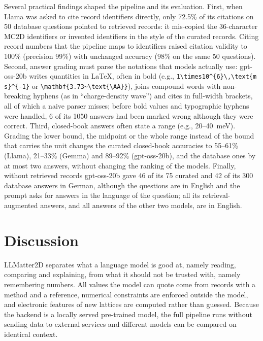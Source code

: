 \documentclass[prmaterials,twocolumn,superscriptaddress,longbibliography,nofootinbib]{revtex4-2}
\begin{document}
Several practical findings shaped the pipeline and its evaluation. First, when Llama was asked to cite record
identifiers directly, only 72.5\% of its citations on 50 database questions pointed to
retrieved records: it mis-copied the 36-character MC2D identifiers or invented identifiers in
the style of the curated records. Citing record numbers that the pipeline maps to identifiers
raised citation validity to 100\% (precision 99\%) with unchanged accuracy (98\% on the same
50 questions). Second, answer grading must parse the notations that models actually use:
gpt-oss-20b writes quantities in \LaTeX{}, often in bold (e.g.,
\verb|1\times10^{6}\,\text{m s}^{-1}| or \verb|\mathbf{3.73~\text{\AA}}|), joins compound
words with non-breaking hyphens (as in ``charge-density wave'') and cites in full-width
brackets, all of which a naive parser misses; before bold values and typographic hyphens were
handled, 6 of its 1050 answers had been marked wrong although they were correct. Third,
closed-book answers often state a range (e.g., 20--40~meV). Grading the lower bound, the
midpoint or the whole range instead of the bound that carries the unit changes the curated
closed-book accuracies to 55--61\% (Llama), 21--33\% (Gemma) and 89--92\% (gpt-oss-20b), and
the database ones by at most two answers, without changing the ranking of the models.
Finally, without retrieved records gpt-oss-20b gave 46 of its 75 curated and 42 of its 300
database answers in German, although the questions are in English and the prompt asks for
answers in the language of the question; all its retrieval-augmented answers, and all answers
of the other two models, are in English.

\section{Discussion}
\label{sec:discussion}

LLMatter2D separates what a language model is good at, namely reading, comparing and
explaining, from what it should not be trusted with, namely remembering numbers. All values
the model can quote come from records with a method and a reference, numerical constraints
are enforced outside the model, and electronic features of new lattices are computed rather
than guessed. Because the backend is a locally served pre-trained model, the full pipeline
runs without sending data to external services and different models can be compared on
identical context.
\end{document}
